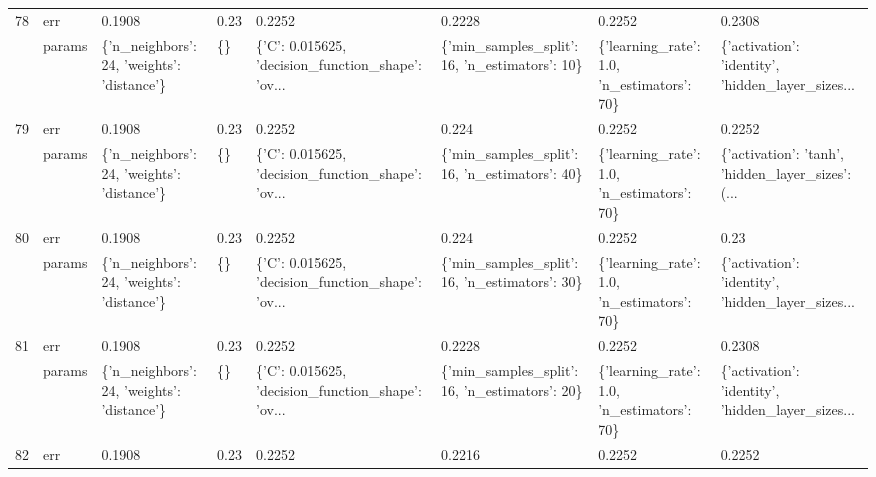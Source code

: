 \begin{tabular}{llllllll}
78  & err &                                      0.1908 &    0.23 &                                             0.2252 &                                         0.2228 &                                       0.2252 &                                             0.2308 \\
    & params &  \{'n\_neighbors': 24, 'weights': 'distance'\} &      \{\} &  \{'C': 0.015625, 'decision\_function\_shape': 'ov... &  \{'min\_samples\_split': 16, 'n\_estimators': 10\} &   \{'learning\_rate': 1.0, 'n\_estimators': 70\} &  \{'activation': 'identity', 'hidden\_layer\_sizes... \\
79  & err &                                      0.1908 &    0.23 &                                             0.2252 &                                          0.224 &                                       0.2252 &                                             0.2252 \\
    & params &  \{'n\_neighbors': 24, 'weights': 'distance'\} &      \{\} &  \{'C': 0.015625, 'decision\_function\_shape': 'ov... &  \{'min\_samples\_split': 16, 'n\_estimators': 40\} &   \{'learning\_rate': 1.0, 'n\_estimators': 70\} &  \{'activation': 'tanh', 'hidden\_layer\_sizes': (... \\
80  & err &                                      0.1908 &    0.23 &                                             0.2252 &                                          0.224 &                                       0.2252 &                                               0.23 \\
    & params &  \{'n\_neighbors': 24, 'weights': 'distance'\} &      \{\} &  \{'C': 0.015625, 'decision\_function\_shape': 'ov... &  \{'min\_samples\_split': 16, 'n\_estimators': 30\} &   \{'learning\_rate': 1.0, 'n\_estimators': 70\} &  \{'activation': 'identity', 'hidden\_layer\_sizes... \\
81  & err &                                      0.1908 &    0.23 &                                             0.2252 &                                         0.2228 &                                       0.2252 &                                             0.2308 \\
    & params &  \{'n\_neighbors': 24, 'weights': 'distance'\} &      \{\} &  \{'C': 0.015625, 'decision\_function\_shape': 'ov... &  \{'min\_samples\_split': 16, 'n\_estimators': 20\} &   \{'learning\_rate': 1.0, 'n\_estimators': 70\} &  \{'activation': 'identity', 'hidden\_layer\_sizes... \\
82  & err &                                      0.1908 &    0.23 &                                             0.2252 &                                         0.2216 &                                       0.2252 &                                             0.2252 \\

\end{tabular}

